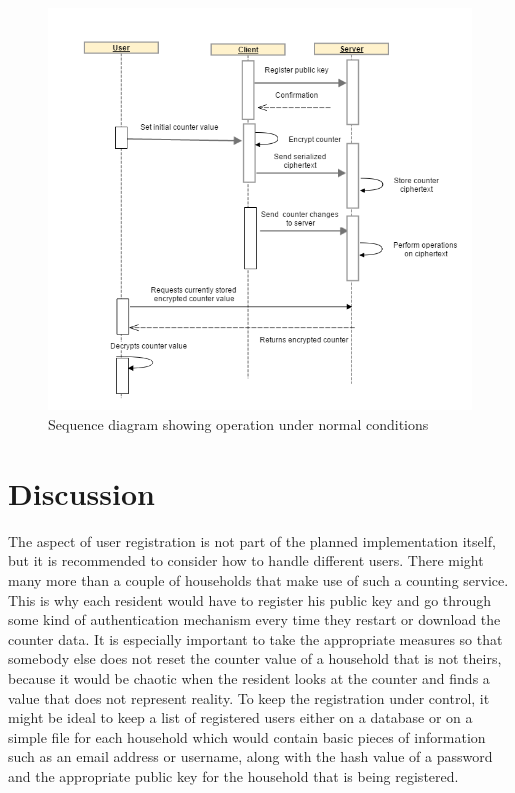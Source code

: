 \begin{figure}[H]
  \centering
  \includegraphics[scale=0.65]{counter}
  \caption{Sequence diagram showing operation under normal conditions}
  \label{fig:seqdiag}
\end{figure}

\section{Discussion}

The aspect of user registration is not part of the planned implementation itself, but it is recommended to consider how to handle different users. There might many more than a couple of households that make use of such a counting service. This is why each resident would have to register his public key and go through some kind of authentication mechanism every time they restart or download the counter data. It is especially important to take the appropriate measures so that somebody else does not reset the counter value of a household that is not theirs, because it would be chaotic when the resident looks at the counter and finds a value that does not represent reality.
To keep the registration under control, it might be ideal to keep a list of registered users either on a database or on a simple file for each household which would contain basic pieces of information such as an email address or username, along with the hash value of a password and the appropriate public key for the household that is being registered.

